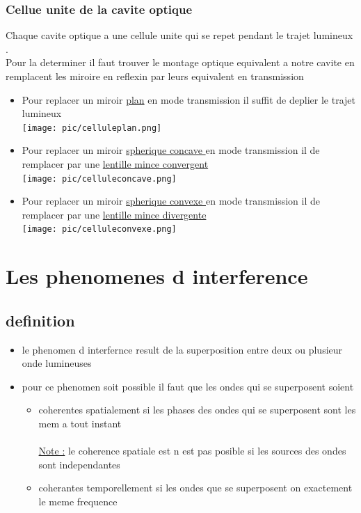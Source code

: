 \documentclass[12pt]{book}
\begin{document}
        \subsection{Cellue unite de la cavite optique}
        Chaque cavite optique a une cellule unite qui se repet pendant le trajet lumineux .\\
        Pour la determiner il faut trouver le montage optique equivalent a notre cavite en remplacent les miroire en reflexin par leurs equivalent en transmission
        \begin{itemize}
            \item Pour replacer un miroir \underline{plan} en mode transmission il suffit de deplier le trajet lumineux
               \\ \texttt{[image: pic/celluleplan.png]}
            \item Pour replacer un miroir \underline{spherique concave } en mode transmission il de remplacer par une \underline{lentille mince convergent}
              \\  \texttt{[image: pic/celluleconcave.png]}
            \item Pour replacer un miroir \underline{spherique convexe } en mode transmission il de remplacer par une \underline{lentille mince divergente}
               \\ \texttt{[image: pic/celluleconvexe.png]}
        \end{itemize}
    \chapter{Les phenomenes d interference}
        \section{definition}
            \begin{itemize}
                \item le phenomen d interfernce result de la superposition entre deux ou plusieur onde lumineuses
                \item pour ce phenomen soit possible il faut que les ondes qui se superposent soient
                    \begin{itemize}
                        \item coherentes spatialement
                            si les phases des ondes qui se superposent sont les mem a tout instant \\
                            \\ \underline{Note :} le coherence spatiale est n est pas posible si les sources des ondes sont independantes
                        \item coherantes temporellement
                            si les ondes que se superposent on exactement le meme frequence
                \end{itemize}
            \end{itemize}
\end{document}
